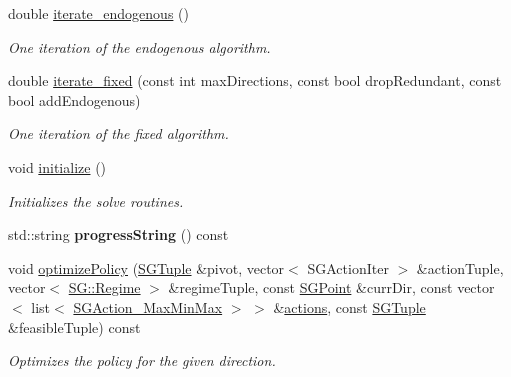 \begin{DoxyCompactItemize}
double \hyperlink{classSGSolver__MaxMinMax__3Player_a51a9f21016a88463930890bd95c0c0de}{iterate\+\_\+endogenous} ()
\begin{DoxyCompactList}\small\item\em One iteration of the endogenous algorithm. \end{DoxyCompactList}\item 
double \hyperlink{classSGSolver__MaxMinMax__3Player_af70c3ae57f9a485f0f66c4dc76eb3bff}{iterate\+\_\+fixed} (const int max\+Directions, const bool drop\+Redundant, const bool add\+Endogenous)
\begin{DoxyCompactList}\small\item\em One iteration of the fixed algorithm. \end{DoxyCompactList}\item 
\mbox{\label{classSGSolver__MaxMinMax__3Player_a53ff30c2388d0dcfef31e45e66d63d6b}} 
void \hyperlink{classSGSolver__MaxMinMax__3Player_a53ff30c2388d0dcfef31e45e66d63d6b}{initialize} ()
\begin{DoxyCompactList}\small\item\em Initializes the solve routines. \end{DoxyCompactList}\item 
\mbox{\label{classSGSolver__MaxMinMax__3Player_a489caa6f4e999195d5f7f480a93ee4b6}} 
std\+::string {\bfseries progress\+String} () const
\item 
\mbox{\label{classSGSolver__MaxMinMax__3Player_af34d61f58b8e3024bbecb6bad4369851}} 
void \hyperlink{classSGSolver__MaxMinMax__3Player_af34d61f58b8e3024bbecb6bad4369851}{optimize\+Policy} (\hyperlink{classSGTuple}{S\+G\+Tuple} \&pivot, vector$<$ S\+G\+Action\+Iter $>$ \&action\+Tuple, vector$<$ \hyperlink{namespaceSG_a139e4dec41ea0f38aae1f93f60cfff60}{S\+G\+::\+Regime} $>$ \&regime\+Tuple, const \hyperlink{classSGPoint}{S\+G\+Point} \&curr\+Dir, const vector$<$ list$<$ \hyperlink{classSGAction__MaxMinMax}{S\+G\+Action\+\_\+\+Max\+Min\+Max} $>$ $>$ \&\hyperlink{classSGSolver__MaxMinMax__3Player_ace3cdb3d3a60e9c43d0a23e8d716080a}{actions}, const \hyperlink{classSGTuple}{S\+G\+Tuple} \&feasible\+Tuple) const
\begin{DoxyCompactList}\small\item\em Optimizes the policy for the given direction. \end{DoxyCompactList}\item 

\end{DoxyCompactItemize}
